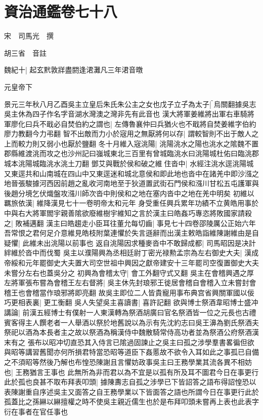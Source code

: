 \section{資治通鑑卷七十八}
宋　司馬光　撰

胡三省　音註

魏紀十|{
	起玄黓敦牂盡閼逢涒灘凡三年涒音暾}


元皇帝下

景元三年秋八月乙酉吳主立皇后朱氏朱公主之女也戊子立子為太子|{
	烏關翻據吳志吳主休為四子作名字音湖水灣澳之灣非先有此音也}
漢大將軍姜維將出軍右車騎將軍廖化曰兵不戢必自焚伯約之謂也|{
	左傳魯襄仲曰兵猶火也不戢將自焚姜維字伯約廖力教翻今力弔翻}
智不出敵而力小於宼用之無厭將何以存|{
	謂較智則不出于敵人之上而較力則又弱小也厭於鹽翻}
冬十月維入宼洮陽|{
	洮陽洮水之陽也洮水之隂魏不置郡縣維渡洮而攻之也沙州記曰嵹城東北三百里有曾城臨洮水曰洮陽城杜佑曰臨洮郡城本洮陽城臨洮水洮土刀翻}
鄧艾與戰於侯和破之維住沓中|{
	水經注洮水逕洮陽城又東逕共和山南城在四山中又東逕迷和城北意侯和即此地也沓中在諸羌中即沙漒之地晉張駿據河西因前趙之亂收河南地至于狄道置武街石門侯和漒川甘松五屯護軍與後趙分境乞伏熾盤攻漒川師次沓中則侯和之地在塞内沓中之地在羌中明矣}
初維以羈旅依漢|{
	維降漢見七十一卷明帝太和元年}
身受重任興兵累年功績不立黄皓用事於中與右大將軍閻宇親善隂欲廢維樹宇維知之言於漢主曰皓姦巧專恣將敗國家請殺之|{
	敗補邁翻}
漢主曰皓趨走小臣耳往董允每切齒|{
	事見七十四卷邵陵厲公正始六年}
吾常恨之君何足介意維見皓枝附葉連懼於失言遜辭而出漢主敕皓詣維陳謝維由是自疑懼|{
	此維未出洮陽以前事也}
返自洮陽因求種麥沓中不敢歸成都|{
	司馬昭因是决計絆維於沓中而伐蜀}
吳主以濮陽興為丞相廷尉丁密光禄勲孟宗為左右御史大夫|{
	漢成帝綏和元年罷御史大夫置大司空世祖中興因之獻帝建安十三年罷司空復置御史大夫未嘗分左右也蓋吳分之}
初興為會稽太守|{
	會工外翻守式又翻}
吳主在會稽興遇之厚左將軍張布嘗為會稽王左右督將|{
	吳主休先封琅邪王徙居會稽自會稽入立未嘗封會稽王也會稽當作琅邪將即亮翻}
故吳主即位二人皆貴寵用事布典宫省興關軍國以佞巧更相表裏|{
	更工衡翻}
吳人失望吳主喜讀書|{
	喜許記翻}
欲與博士祭酒韋昭博士盛冲講論|{
	前漢五經博士有僕射一人東漢轉為祭酒胡廣曰官名祭酒皆一位之元長也古禮賓客得主人饌老者一人舉酒以祭於地舊說以為示有先沈約志曰吳王濞為劉氏祭酒夫祭祀以酒為本長者主之故以祭酒為稱漢侍中魏散騎常侍高功者並為祭酒公府祭酒漢末有之}
張布以昭冲切直恐其入侍言已隂過固諫止之吳主曰孤之涉學羣書畧徧但欲與昭等講習舊聞亦何所損君特當恐昭等道臣下姦慝故不欲令入耳如此之事孤已自備之不須昭等然後乃解也布惶恐陳謝且言懼妨政事吳主曰王務學業其流各異不相妨也|{
	王務猶言王事也}
此無所為非而君以為不宜是以孤有所及耳不圖君今日在事更行此於孤也良甚不取布拜表叩頭|{
	據陳夀志自孤之涉學已下皆詔答之語布得詔惶恐以表陳謝重自序述吳主又面答之自王務學業以下皆面答之語也所謂今日在事更行此於孤蓋比之孫綝以綝擅權之時不使吳主親近儒生也於是布拜叩頭未嘗再上表也此表字衍在事者在官任事也}
